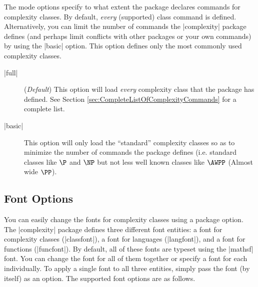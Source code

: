 \documentclass{ltxdoc}
\begin{document}
The mode options specify to what extent the package declares
commands for complexity classes.  By default, \emph{every}
(supported) class command is defined.  Alternatively, you can limit
the number of commands the |complexity| package defines (and perhaps
limit conflicts with other packages or your own commands) by using
the |basic| option. This option defines only the most commonly used
complexity classes.

\begin{description}

  \item[|full|] (\emph{Default}) This option will load \emph{every} complexity class
  that the package has defined.  See Section
  \ref{sec:CompleteListOfComplexityCommands} for a complete list.

  \item[|basic|]  This option will only load the
  ``standard'' complexity classes so as to minimize the number of
  commands the package defines (i.e. standard classes like $\P$ and
  $\NP$ but not less well known classes like $\AWPP$ (Almost wide $\PP$).

\end{description}

\subsection{Font Options}

You can easily change the fonts for complexity classes using
a package option.  The |complexity| package defines three different
font entities: a font for complexity classes (|classfont|), a font
for languages (|langfont|), and a font for functions (|funcfont|).
By default, all of these fonts are typeset using the |mathsf| font.
You can change the font for all of them together or specify a font
for each individually.  To apply a single font to all three entities,
simply pass the font (by itself) as an option.  The supported font
options are as follows.
\end{document}
